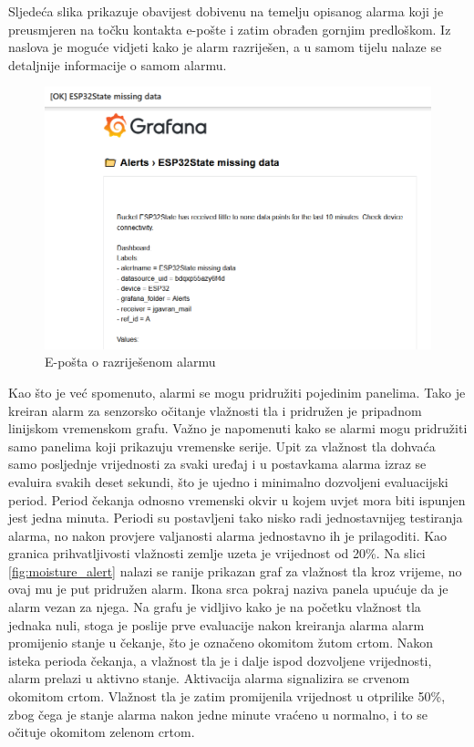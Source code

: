 Sljedeća slika prikazuje obavijest dobivenu na temelju opisanog alarma koji je preusmjeren na točku kontakta e-pošte i zatim obrađen gornjim predloškom. Iz naslova je moguće vidjeti kako je alarm razriješen, a u samom tijelu nalaze se detaljnije informacije o samom alarmu. 

\begin{figure}[ht]
	\centering
	\includegraphics[scale=0.6]{imgs/alert_mail}
	\caption{E-pošta o razriješenom alarmu}
	\label{fig:alert_mail}
\end{figure}

Kao što je već spomenuto, alarmi se mogu pridružiti pojedinim panelima. Tako je kreiran alarm za senzorsko očitanje vlažnosti tla i pridružen je pripadnom linijskom vremenskom grafu. Važno je napomenuti kako se alarmi mogu pridružiti samo panelima koji prikazuju vremenske serije. Upit za vlažnost tla dohvaća samo posljednje vrijednosti za svaki uređaj i u postavkama alarma izraz se evaluira svakih deset sekundi, što je ujedno i minimalno dozvoljeni evaluacijski period. Period čekanja odnosno vremenski okvir u kojem uvjet mora biti ispunjen jest jedna minuta. Periodi su postavljeni tako nisko radi jednostavnijeg testiranja alarma, no nakon provjere valjanosti alarma jednostavno ih je prilagoditi. Kao granica prihvatljivosti vlažnosti zemlje uzeta je vrijednost od 20\%. Na slici \ref{fig:moisture_alert} nalazi se ranije prikazan graf za vlažnost tla kroz vrijeme, no ovaj mu je put pridružen alarm. Ikona srca pokraj naziva panela upućuje da je alarm vezan za njega. Na grafu je vidljivo kako je na početku vlažnost tla jednaka nuli, stoga je poslije prve evaluacije nakon kreiranja alarma alarm promijenio stanje u čekanje, što je označeno okomitom žutom crtom. Nakon isteka perioda čekanja, a vlažnost tla je i dalje ispod dozvoljene vrijednosti, alarm prelazi u aktivno stanje. Aktivacija alarma signalizira se crvenom okomitom crtom. Vlažnost tla je zatim promijenila vrijednost u otprilike 50\%, zbog čega je stanje alarma nakon jedne minute vraćeno u normalno, i to se očituje okomitom zelenom crtom.

